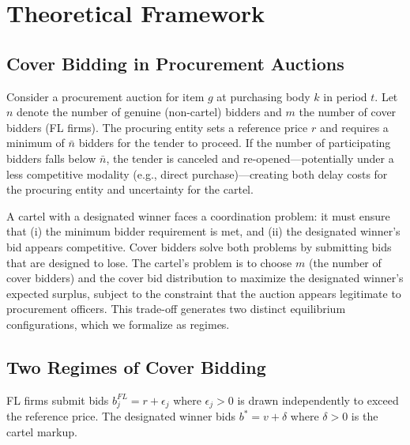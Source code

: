 \section{Theoretical Framework}
\label{sec:theory}

\subsection{Cover Bidding in Procurement Auctions}

Consider a procurement auction for item $g$ at purchasing body $k$ in period $t$. Let $n$ denote the number of genuine (non-cartel) bidders and $m$ the number of cover bidders (FL firms). The procuring entity sets a reference price $r$ and requires a minimum of $\bar{n}$ bidders for the tender to proceed. If the number of participating bidders falls below $\bar{n}$, the tender is canceled and re-opened---potentially under a less competitive modality (e.g., direct purchase)---creating both delay costs for the procuring entity and uncertainty for the cartel.

A cartel with a designated winner faces a coordination problem: it must ensure that (i) the minimum bidder requirement is met, and (ii) the designated winner's bid appears competitive. Cover bidders solve both problems by submitting bids that are designed to lose. The cartel's problem is to choose $m$ (the number of cover bidders) and the cover bid distribution to maximize the designated winner's expected surplus, subject to the constraint that the auction appears legitimate to procurement officers. This trade-off generates two distinct equilibrium configurations, which we formalize as regimes.

\subsection{Two Regimes of Cover Bidding}

\begin{proposition}
FL firms submit bids $b_j^{FL} = r + \epsilon_j$ where $\epsilon_j > 0$ is drawn independently to exceed the reference price. The designated winner bids $b^* = v + \delta$ where $\delta > 0$ is the cartel markup.
\end{proposition}


